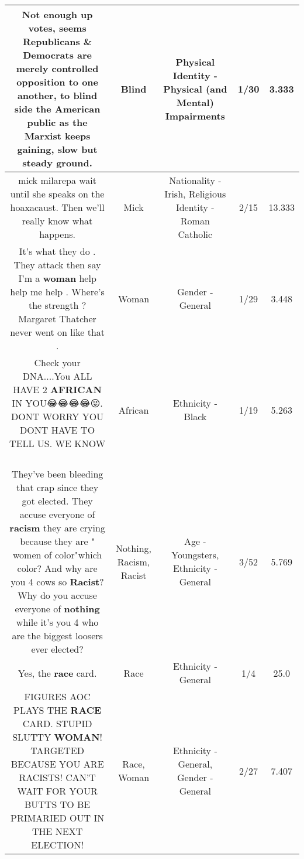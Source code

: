 \documentclass[11pt]{article}
\newlength\mylength
\begin{document}
\begin{center}
\begin{longtable}{|C{.65\mylength}|C{.30\mylength}|C{.12\mylength}|C{.12\mylength}|C{.12\mylength}|}
  \small Not enough up votes, seems Republicans \& Democrats are merely controlled opposition to one another, to \textbf{blind} side the American public as the Marxist keeps gaining, slow but steady ground.\normalsize   & Blind & Physical Identity - Physical (and Mental) Impairments & 1/30 & 3.333 \\  \hline
  \small mick milarepa wait until she speaks on the hoaxacaust. Then we'll really know what happens.\normalsize   & Mick & Nationality - Irish, Religious Identity - Roman Catholic & 2/15 & 13.333 \\  \hline
  \small It's what they do . They attack then say I'm a \textbf{woman} help help me help . Where's the strength ? Margaret Thatcher never went on like that .\normalsize   & Woman & Gender - General & 1/29 & 3.448 \\  \hline
  \small Check your DNA....You ALL HAVE 2 \textbf{AFRICAN} IN YOU😂😂😂😂😜. DONT WORRY YOU DONT HAVE TO TELL US. WE KNOW🤗\normalsize   & African & Ethnicity - Black & 1/19 & 5.263 \\  \hline
  \small They've been bleeding that crap since they got elected. They accuse everyone of \textbf{racism} they are crying because they are " women of color"which color? And why are you 4 cows so \textbf{Racist}?  Why do you accuse everyone of \textbf{nothing} while it's you 4 who are the biggest loosers ever elected?\normalsize   & Nothing, Racism, Racist & Age - Youngsters, Ethnicity - General & 3/52 & 5.769 \\  \hline
  \small Yes, the \textbf{race} card.\normalsize   & Race & Ethnicity - General & 1/4 & 25.0 \\  \hline
  \small FIGURES AOC PLAYS THE \textbf{RACE} CARD.  STUPID SLUTTY \textbf{WOMAN}!  TARGETED BECAUSE YOU ARE RACISTS!  CAN'T WAIT FOR YOUR BUTTS TO BE PRIMARIED OUT IN THE NEXT ELECTION!\normalsize   & Race, Woman & Ethnicity - General, Gender - General & 2/27 & 7.407 \\  \hline

\end{longtable}
\end{center}
\end{document}
